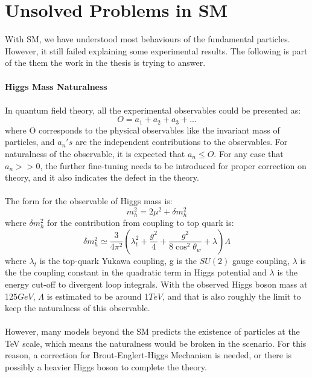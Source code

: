 \section{Unsolved Problems in SM}
With SM, we have understood most behaviours of the fundamental particles. However, it still failed explaining some experimental results. The following is part of the them the work in the thesis is trying to answer.
\\
\\{\bf Higgs Mass Naturalness\cite{WILLIAMS201582}}
\\
\\In quantum field theory, all the experimental observables could be presented as:
\begin{equation}
O=a_1+a_2+a_3+...
\end{equation}
where O corresponds to the physical observables like the invariant mass of particles, and $a_n's$ are the independent contributions to the observables. For naturalness of the observable, it is expected that $a_n\leq O$. For any case that $a_n>>0$, the further fine-tuning needs to be introduced for proper correction on theory, and it also indicates the defect in the theory. \\
\\The form for the observable of Higgs mass is:
\begin{equation}
m_h^2=2\mu^2+\delta m_h^2
\end{equation}
where $\delta m_h^2$ for the contribution from coupling to top quark is:
\begin{equation}
\delta m_h^2 \simeq \frac{3}{4\pi^2}\left(\lambda^2_t+\frac{g^2}{4}+\frac{g^2}{8\cos^2{\theta_w}}+\lambda\right)\Lambda
\end{equation}
where $\lambda_t$ is the top-quark Yukawa coupling, g is the $SU\left(2\right)$ gauge coupling, $\lambda$ is the the coupling constant in the quadratic term in Higgs potential and $\lambda$ is the energy cut-off to divergent loop integrals. With the observed Higgs boson mass at 125$GeV$, $\Lambda$ is estimated to be around 1$TeV$, and that is also roughly the limit to keep the naturalness of this observable. 
\\
\\However, many models beyond the SM predicts the existence of particles at the TeV scale, which means the naturalness would be broken in the scenario. For this reason, a correction for Brout-Englert-Higgs Mechanism is needed, or there is possibly a heavier Higgs boson to complete the theory.  
\\
